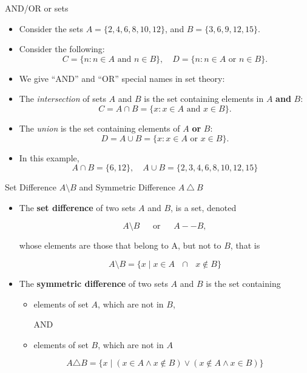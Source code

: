 \documentclass[11pt,aspectratio=1610]{beamer}
\begin{document}
\begin{frame}{AND/OR or sets}
	\begin{itemize}
		\item Consider the sets $A = \{2, 4, 6, 8, 10, 12\}$, and $B = \{3, 6, 9, 12, 15\}$. \p
		\item Consider the following: 
		\[
		C = \{n : n \in A \textrm{ and } n \in B\}, \quad D = \{n : n \in A \textrm{ or } n \in B\}.
		\]\p \vspace{-2mm}
		\item We give ``AND'' and ``OR'' special names in set theory: \p
			\vspace{2mm}
		
		\item[\finger] The \emph{intersection} of sets $A$ and $B$ is the set containing elements in $A$ \textbf{and} $B$:
		\[
		C = A \cap B = \{x : x \in A \textrm{ and } x \in B\}.
		\]\p
	
		
		\item[\finger] The \emph{union} is the set containing elements of $A$ \textbf{or} $B$:
		\[
		D = A \cup B = \{x : x \in A \textrm{ or } x \in B\}.
		\]\p
		\item In this example, 
		\[
		A \cap B = \{6,12\}, \quad A \cup B = \{2,3,4,6,8,10,12,15\}
		\]
	\end{itemize}
\end{frame}










\begin{frame}{Set Difference $A\setminus B$ and Symmetric Difference $A~\triangle~B$ }
	
	\begin{itemize}
		\item The \textbf{set difference} of two sets $A$ and $B$, is a set, denoted
		
		$$A\setminus B~~~~~~~\text{or}~~~~~~~A--B,$$
		
		 whose elements are those that belong to A, but not to $B$, that is

	$$ A\setminus B=\{x\mid x\in A~~~\cap~~~ x\not \in B\}$$ \p 
	
	\item The \textbf{symmetric difference} of two sets $A$ and $B$ is the set containing
	\begin{itemize}
		\item elements of set $A$, which are not in $B$, 
		
		AND
		
		\item elements of set $B$, which are not in $A$ \p 
	\end{itemize}
	
	
	$$A \triangle B = \{x \mid (x \in A \land x \notin B) \lor (x \notin A \land x \in B)\}$$
	
	\end{itemize}
	
	
\end{frame}
\end{document}
